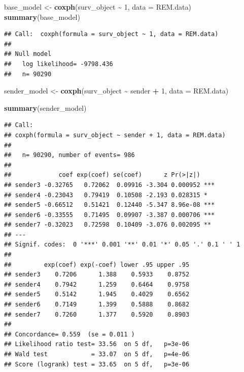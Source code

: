 \documentclass[
]{article}
\newenvironment{Shaded}{\begin{snugshade}}{\end{snugshade}}
\newcommand{\AttributeTok}[1]{\textcolor[rgb]{0.13,0.29,0.53}{#1}}
\newcommand{\DecValTok}[1]{\textcolor[rgb]{0.00,0.00,0.81}{#1}}
\newcommand{\FunctionTok}[1]{\textcolor[rgb]{0.13,0.29,0.53}{\textbf{#1}}}
\newcommand{\NormalTok}[1]{#1}
\newcommand{\OtherTok}[1]{\textcolor[rgb]{0.56,0.35,0.01}{#1}}
\newcommand{\SpecialCharTok}[1]{\textcolor[rgb]{0.81,0.36,0.00}{\textbf{#1}}}
\begin{document}
\begin{Shaded}
\begin{Highlighting}[]
\NormalTok{base\_model }\OtherTok{\textless{}{-}} \FunctionTok{coxph}\NormalTok{(surv\_object }\SpecialCharTok{\textasciitilde{}} \DecValTok{1}\NormalTok{, }\AttributeTok{data =}\NormalTok{ REM.data)}
\FunctionTok{summary}\NormalTok{(base\_model)}
\end{Highlighting}
\end{Shaded}

\begin{verbatim}
## Call:  coxph(formula = surv_object ~ 1, data = REM.data)
## 
## Null model
##   log likelihood= -9798.436 
##   n= 90290
\end{verbatim}

\begin{Shaded}
\begin{Highlighting}[]
\NormalTok{sender\_model }\OtherTok{\textless{}{-}} \FunctionTok{coxph}\NormalTok{(surv\_object }\SpecialCharTok{\textasciitilde{}}\NormalTok{ sender }\SpecialCharTok{+} \DecValTok{1}\NormalTok{, }\AttributeTok{data =}\NormalTok{ REM.data)}


\FunctionTok{summary}\NormalTok{(sender\_model)}
\end{Highlighting}
\end{Shaded}

\begin{verbatim}
## Call:
## coxph(formula = surv_object ~ sender + 1, data = REM.data)
## 
##   n= 90290, number of events= 986 
## 
##             coef exp(coef) se(coef)      z Pr(>|z|)    
## sender3 -0.32765   0.72062  0.09916 -3.304 0.000952 ***
## sender4 -0.23043   0.79419  0.10508 -2.193 0.028315 *  
## sender5 -0.66512   0.51421  0.12440 -5.347 8.96e-08 ***
## sender6 -0.33555   0.71495  0.09907 -3.387 0.000706 ***
## sender7 -0.32023   0.72598  0.10409 -3.076 0.002095 ** 
## ---
## Signif. codes:  0 '***' 0.001 '**' 0.01 '*' 0.05 '.' 0.1 ' ' 1
## 
##         exp(coef) exp(-coef) lower .95 upper .95
## sender3    0.7206      1.388    0.5933    0.8752
## sender4    0.7942      1.259    0.6464    0.9758
## sender5    0.5142      1.945    0.4029    0.6562
## sender6    0.7149      1.399    0.5888    0.8682
## sender7    0.7260      1.377    0.5920    0.8903
## 
## Concordance= 0.559  (se = 0.011 )
## Likelihood ratio test= 33.56  on 5 df,   p=3e-06
## Wald test            = 33.07  on 5 df,   p=4e-06
## Score (logrank) test = 33.65  on 5 df,   p=3e-06
\end{verbatim}
\end{document}
